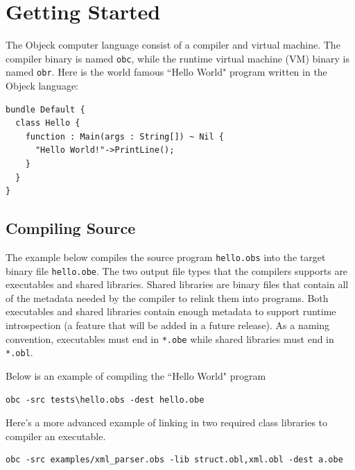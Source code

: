 \documentclass[12pt]{article}
\begin{document}
\section{Getting Started}

The Objeck computer language consist of a compiler and virtual machine.  The compiler binary is named \texttt{obc}, while the runtime virtual machine (VM) binary is named \texttt{obr}.  Here is the world famous ``Hello World" program written in the Objeck language:

\begin{verbatim}
bundle Default {
  class Hello {
    function : Main(args : String[]) ~ Nil {
      "Hello World!"->PrintLine();
    }
  }
}
\end{verbatim}

\subsection{Compiling Source}
The example below compiles the source program \texttt{hello.obs} into the target binary file \texttt{hello.obe}.  The two output file types that the compilers supports are executables and shared libraries.  Shared libraries are binary files that contain all of the metadata needed by the compiler to relink them into programs.  Both executables and shared libraries contain enough metadata to support runtime introspection (a feature that will be added in a future release).  As a naming convention, executables must end in \texttt{*.obe} while shared libraries must end in \texttt{*.obl}.

Below is an example of compiling the ``Hello World" program
\begin{verbatim}
obc -src tests\hello.obs -dest hello.obe
\end{verbatim}

Here's a more advanced example of linking in two required class
libraries to compiler an executable. 
\begin{verbatim}
obc -src examples/xml_parser.obs -lib struct.obl,xml.obl -dest a.obe
\end{verbatim}
\end{document}
